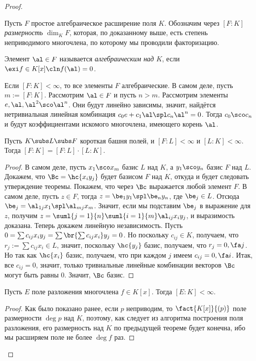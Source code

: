 \documentclass[a4paper]{article}
\begin{document}
\begin{proof}
\begin{df}
Пусть $F$ простое алгебраическое расширение поля $K$. Обозначим через $[F:K]$ \emph{размерность} $\dim_K F$,
которая, по доказанному выше, есть степень неприводимого многочлена, по которому мы проводили факторизацию.
\end{df}

\begin{df}
Элемент $\al \in F$ называется \emph{алгебраическим над} $K$, если $\exi f \in K[x]\cln f(\al)=0$.
\end{df}

Если $[F:K] < \infty$, то все элементы $F$ алгебраические. В самом деле, пусть $m := [F:K]$. Рассмотрим $\al
\in F$ и пусть $n>m$. Рассмотрим элементы $e, \al, \al^2\sco \al^n$. Они будут линейно зависимы, значит,
найдётся нетривиальная линейная комбинация $c_0e+c_1\al \spl c_n\al^n=0$. Тогда $c_0\sco c_n$ и будут
коэффициентами искомого многочлена, имеющего корень $\al$.

\begin{theorem}
Пусть $K \subs L \subs F$ короткая башня полей, и $[F:L]<\infty$ и $[L:K]<\infty$.  Тогда
$[F:K]=[F:L]\cdot[L:K]$.
\end{theorem}
\begin{proof}
В самом деле, пусть $x_1\sco x_m$ базис $L$ над $K$, а $y_1\sco y_n$  базис $F$ над $L$. Докажем, что
$\Bc=\hc{x_iy_j}$ будет базисом $F$ над $K$, откуда и будет следовать утверждение теоремы. Покажем, что через
$\Bc$ выражается любой элемент $F$. В самом деле, пусть $z \in F$, тогда $z=\be_1y_1 \spl \be_ny_n$, где
$\be_j \in L$. Отсюда $\be_j = \al_{1j}x_1 \spl \al_{mj}x_m$. Значит, если мы подставим $\be_j$ в выражение
для $z$, получим $z = \suml{j=1}{n}\suml{i=1}{m}\al_{ij}x_iy_j$, и выразимость доказана. Теперь докажем
линейную независимость. Пусть $0=\sum c_{ij} x_iy_j=\sum\br{\sum c_{ij}x_i}y_j=0$. Но поскольку $c_{ij} \in
K$, получаем, что $r_j := \sum c_{ij}x_i \in L$, значит, поскольку $\hc{y_j}$ базис, получаем, что $r_j =
0, \fa j$. Но так как $\hc{x_i}$ базис, получаем, что при каждом $j$ имеем $c_{ij}=0, \fa i$. Итак, все
$c_{ij}=0$, значит, только тривиальные линейные комбинации векторов $\Bc$ могут быть равны 0. Значит, $\Bc$
базис.
\end{proof}

\begin{imp}
Пусть $E$ поле разложения многочлена $f \in K[x]$. Тогда $[E:K]<\infty$.
\end{imp}
\begin{proof}
Как было показано ранее, если $p$ неприводим, то $\fact{K[x]}{(p)}$ поле  размерности $\deg p$ над $K$,
поэтому, как следует из алгоритма построения поля разложения, его размерность над $K$ по предыдущей теореме
будет конечна, ибо мы расширяем поле не более $\deg f$ раз.
\end{proof}


\end{proof}
\end{document}

